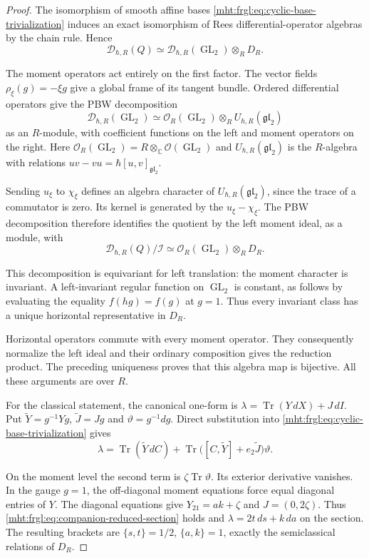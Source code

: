 \begin{proof}
The isomorphism of smooth affine bases
\eqref{mht:frgl:eq:cyclic-base-trivialization} induces an exact
isomorphism of Rees differential-operator algebras by the
chain rule.  Hence
\[
 \mathscr D_{\hbar,R}(Q)
  \simeq\mathscr D_{\hbar,R}(\operatorname{GL}_2)\otimes_R D_R.
\]

The moment operators act entirely on the first factor.
The vector fields $\rho_\xi(g)=-\xi g$ give a global frame
of its tangent bundle.  Ordered differential operators give
the PBW decomposition
\[
 \mathscr D_{\hbar,R}(\operatorname{GL}_2)
    \simeq \mathcal O_R(\operatorname{GL}_2)\otimes_R U_{\hbar,R}(\mathfrak{gl}_2)
\]
as an $R$-module, with coefficient functions on the left
and moment operators on the right.  Here
$\mathcal O_R(\operatorname{GL}_2)=R\otimes_{\mathbb C}\mathcal O(\operatorname{GL}_2)$ and
$U_{\hbar,R}(\mathfrak{gl}_2)$ is the $R$-algebra with
relations $uv-vu=\hbar[u,v]_{\mathfrak{gl}_2}$.

Sending $u_\xi$ to $\chi_\xi$ defines an algebra character
of $U_{\hbar,R}(\mathfrak{gl}_2)$, since the trace of a
commutator is zero.
Its kernel is generated by the $u_\xi-\chi_\xi$.
The PBW decomposition therefore identifies the quotient
by the left moment ideal, as a module, with
\[
 \mathscr D_{\hbar,R}(Q)/\mathcal I
       \simeq \mathcal O_R(\operatorname{GL}_2)\otimes_R D_R.
\]

This decomposition is equivariant for left translation:
the moment character is invariant.  A left-invariant
regular function on $\operatorname{GL}_2$ is constant, as follows by
evaluating the equality $f(hg)=f(g)$ at $g=1$.
Thus every invariant class has a unique horizontal
representative in $D_R$.

Horizontal operators commute with every moment operator.
They consequently normalize the left ideal and their
ordinary composition gives the reduction product.
The preceding uniqueness proves that this algebra map
is bijective.  All these arguments are over $R$.

For the classical statement, the canonical one-form is
$\lambda=\operatorname{Tr}(Y\,dX)+J\,dI$.
Put $\widetilde Y=g^{-1}Yg$,
$\widetilde J=Jg$ and $\vartheta=g^{-1}dg$.
Direct substitution into \eqref{mht:frgl:eq:cyclic-base-trivialization}
gives
\[
 \lambda=\operatorname{Tr}(\widetilde Y\,dC)
       +\operatorname{Tr}\bigl(
         [C,\widetilde Y]+e_2\widetilde J\bigr)\vartheta.
\]

On the moment level the second term is
$\zeta\operatorname{Tr}\vartheta$. Its exterior derivative
vanishes.  In the gauge $g=1$, the off-diagonal moment equations force equal
diagonal entries of $Y$. The diagonal equations give
$Y_{21}=ak+\zeta$ and $J=(0,2\zeta)$.
Thus \eqref{mht:frgl:eq:companion-reduced-section} holds and
$\lambda=2t\,ds+k\,da$ on the section.
The resulting brackets are
$\{s,t\}=1/2$, $\{a,k\}=1$, exactly the semiclassical
relations of $D_R$.
\end{proof}

